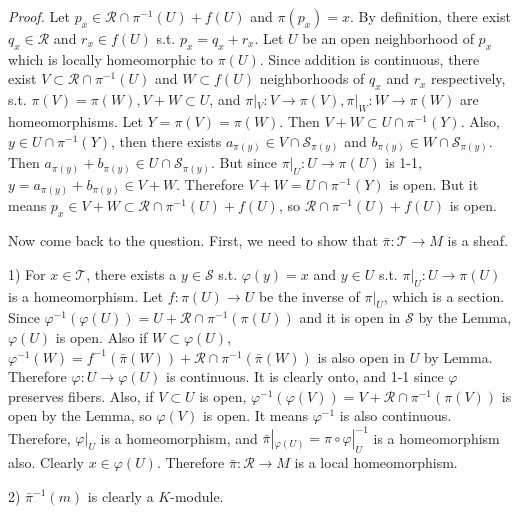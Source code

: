 \begin{enumerate}
\textit{Proof.} Let $p_{x} \in \mathcal{R} \cap \pi^{-1}(U)+f(U)$ and $\pi(p_{x})=x$. 
By definition, there exist $q_{x} \in \mathcal{R}$ and $r_{x} \in f(U)$ s.t. $p_{x}=q_{x}+r_{x}$. 
Let $U$ be an open neighborhood of $p_{x}$ which is locally homeomorphic to $\pi(U)$. Since addition is continuous, 
there exist $V \subset \mathcal{R} \cap \pi^{-1}(U)$ and $W \subset f(U)$ neighborhoods of $q_{x}$ and $r_{x}$ respectively, s.t. $\pi(V)=\pi(W), V+W \subset U$, and $\pi|_{V}\colon V \rightarrow \pi(V), \pi|_{W}\colon W \rightarrow \pi(W)$ are homeomorphisms. 
Let $Y=\pi(V)=\pi(W)$. Then $V+W \subset U \cap \pi^{-1}(Y)$. 
Also, $y \in U \cap \pi^{-1}(Y)$, then there exists $a_{\pi(y)} \in V \cap \mathcal{S}_{\pi(y)}$ and $b_{\pi(y)} \in W \cap \mathcal{S}_{\pi(y)}$. 
Then $a_{\pi(y)}+b_{\pi(y)} \in U \cap \mathcal{S}_{\pi(y)}$. 
But since $\pi|_{U}\colon U \rightarrow \pi(U)$ is 1-1, 
$y=a_{\pi(y)}+b_{\pi(y)} \in V+W$. Therefore $V+W=U \cap \pi^{-1}(Y)$ is open. 
But it means $p_{x} \in V+W \subset \mathcal{R} \cap \pi^{-1}(U)+f(U)$, 
so $\mathcal{R} \cap \pi^{-1}(U)+f(U)$ is open.

Now come back to the question. First, we need to show that $\bar{\pi}\colon \mathcal{T} \rightarrow M$ is a sheaf.

1) For $x \in \mathcal{T}$, there exists a $y \in \mathcal{S}$ s.t. $\varphi(y)=x$ 
and $y \in U$ s.t. $\pi|_{U}\colon U \rightarrow \pi(U)$ is a homeomorphism. 
Let $f\colon \pi(U) \rightarrow U$ be the inverse of $\left.\pi\right|_{U}$, which is a section. 
Since $\varphi^{-1}(\varphi(U))=U+\mathcal{R} \cap \pi^{-1}(\pi(U))$ and it is open in $\mathcal{S}$ by the Lemma, $\varphi(U)$ is open. 
Also if $W \subset \varphi(U)$, $\varphi^{-1}(W)=f^{-1}(\bar{\pi}(W))+\mathcal{R} \cap \pi^{-1}(\bar{\pi}(W))$ is also open in $U$ by Lemma. 
Therefore $\varphi\colon U \rightarrow \varphi(U)$ is continuous. It is clearly onto, and 1-1 since $\varphi$ preserves fibers. 
Also, if $V \subset U$ is open, $\varphi^{-1}(\varphi(V))=V+\mathcal{R} \cap \pi^{-1}(\pi(V))$ is open by the Lemma, so $\varphi(V)$ is open. 
It means $\varphi^{-1}$ is also continuous. Therefore, $\varphi|_{U}$ is a homeomorphism, and $\bar{\pi}|_{\varphi(U)}=\pi \circ \varphi|_{U}^{-1}$ is a homeomorphism also. 
Clearly $x \in \varphi(U)$. Therefore $\bar{\pi}\colon \mathcal{R} \rightarrow M$ is a local homeomorphism.

2) $\bar{\pi}^{-1}(m)$ is clearly a $K$-module.


\end{enumerate}
